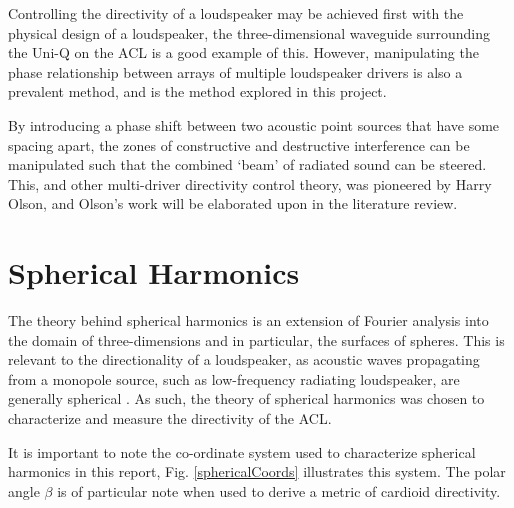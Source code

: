 \documentclass{report}
\begin{document}
        Controlling the directivity of a loudspeaker may be achieved first with the physical design of a loudspeaker, the three-dimensional waveguide surrounding the Uni-Q on the ACL is a good example of this.
        However, manipulating the phase relationship between arrays of multiple loudspeaker drivers is also a prevalent method, and is the method explored in this project.

        By introducing a phase shift between two acoustic point sources that have some spacing apart, the zones of constructive and destructive interference can be manipulated such that the combined `beam' of radiated sound can be steered.
        This, and other multi-driver directivity control theory, was pioneered by Harry Olson, and Olson's work will be elaborated upon in the literature review.
        
    \section{Spherical Harmonics}
        The theory behind spherical harmonics is an extension of Fourier analysis into the domain of three-dimensions and in particular, the surfaces of spheres.
        This is relevant to the directionality of a loudspeaker, as acoustic waves propagating from a monopole source, such as low-frequency radiating loudspeaker, are generally spherical \cite{kinslerFreySpherical}.
        As such, the theory of spherical harmonics was chosen to characterize and measure the directivity of the ACL.

        It is important to note the co-ordinate system used to characterize spherical harmonics in this report, Fig. \ref{sphericalCoords} illustrates this system.
        The polar angle $\beta$ is of particular note when used to derive a metric of cardioid directivity.
    
\end{document}
